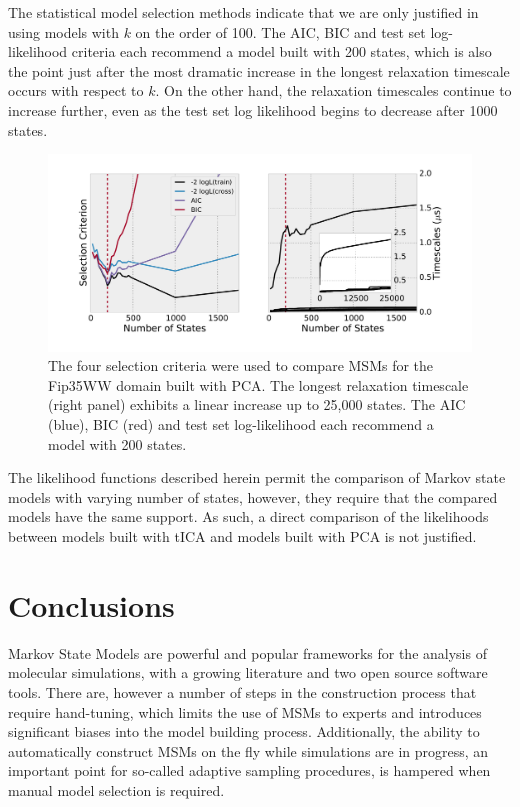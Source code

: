 \documentclass[journal=jpcbfk, layout=traditional, manuscript=article]{achemso}
\begin{document}
The statistical model selection methods indicate that we are only justified in using models with $k$ on the order of 100. The AIC, BIC and test set log-likelihood criteria each recommend a model built with 200 states, which is also the point just after the most dramatic increase in the longest relaxation timescale occurs with respect to $k$. On the other hand, the relaxation timescales continue to increase further, even as the test set log likelihood begins to decrease after 1000 states.


\begin{figure}
\centering
\label{fig:ww-pca}
\includegraphics[width=6in]{figs/ww_pca/ww_pca.pdf}
\caption{The four selection criteria were used to compare MSMs for the Fip35WW domain built with PCA. The longest relaxation timescale (right panel) exhibits a linear increase up to 25,000 states. The AIC (blue), BIC (red) and test set log-likelihood each recommend a model with 200 states.} 
\end{figure}

The likelihood functions described herein permit the comparison of Markov state models with varying number of states, however, they require that the compared models have the same support. As such, a direct comparison of the likelihoods between models built with tICA and models built with PCA is not justified.

\section{Conclusions}

Markov State Models are powerful and popular frameworks for the analysis of molecular simulations, with a growing literature and two open source software tools\cite{Beauchamp2011Msmbuilder2, Senne2012EMMA}. There are, however a number of steps in the construction process that require hand-tuning, which limits the use of MSMs to experts and introduces significant biases into the model building process. Additionally, the ability to automatically construct MSMs on the fly while simulations are in progress, an important point for so-called adaptive sampling procedures\cite{Bowman2010Enhanced}, is hampered when manual model selection is required. 
\end{document}
